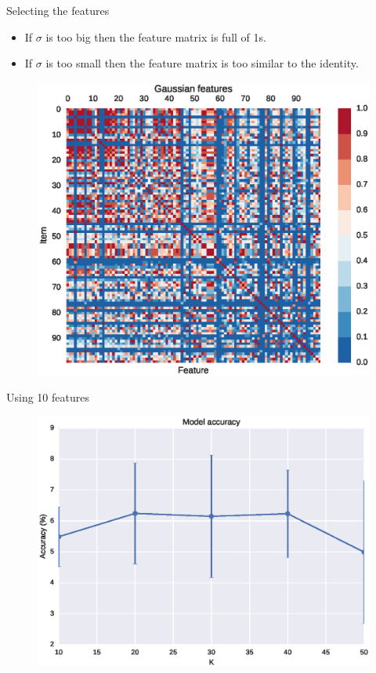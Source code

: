 \documentclass{beamer}
\begin{document}
\begin{frame}{Selecting the features}
  \begin{itemize}
    \item If $\sigma$ is too big then the feature matrix is full of 1s.
    \item If $\sigma$ is too small then the feature matrix is too similar to the identity.
  \end{itemize}
  \begin{figure}
    \centering
    \includegraphics[height=0.5\textheight]{gaussian_features_n_100_0dot15}
  \end{figure}
\end{frame}

\begin{frame}{Using 10 features}
  \begin{figure}
    \includegraphics[height=0.8\textheight]{score_100_no_singles_features_only_coherence}
  \end{figure}
\end{frame}
\end{document}
